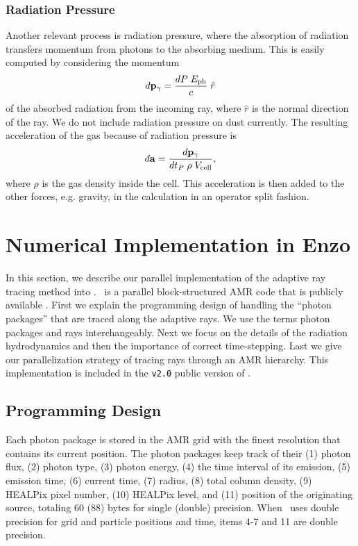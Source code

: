 \documentclass[useAMS,usenatbib]{mn2e}
\begin{document}
\subsubsection{Radiation Pressure}

Another relevant process is radiation pressure, where the absorption
of radiation transfers momentum from photons to the absorbing medium.
This is easily computed by considering the momentum
\begin{equation}
  d\mathbf{p}_\gamma = \frac{dP \; E_{\rm ph}}{c} \; \hat{r}
\end{equation}
of the absorbed radiation from the incoming ray, where $\hat{r}$ is
the normal direction of the ray.  We do not include radiation pressure
on dust currently.  The resulting acceleration of the gas because of
radiation pressure is
\begin{equation}
  d\mathbf{a} = \frac{d\mathbf{p}_\gamma} {dt_P\; \rho \; V_{\rm cell}},
\end{equation}
where $\rho$ is the gas density inside the cell.  This acceleration is
then added to the other forces, e.g. gravity, in the calculation in an
operator split fashion.

\section{Numerical Implementation in Enzo}

In this section, we describe our parallel implementation of the
adaptive ray tracing method into \enzo.  \enzo~is a parallel
block-structured AMR \citep{BergerAMR} code that is publicly available
\citep{BryanNorman1997, OShea2004}.  First we explain the programming
design of handling the ``photon packages'' that are traced along the
adaptive rays.  We use the terms photon packages and rays
interchangeably.  Next we focus on the details of the radiation
hydrodynamics and then the importance of correct time-stepping.  Last
we give our parallelization strategy of tracing rays through an AMR
hierarchy.  This implementation is included in the \texttt{v2.0}
public version of \enzo.

\subsection{Programming Design}
\label{sec:design}

Each photon package is stored in the AMR grid with the finest
resolution that contains its current position.  The photon packages
keep track of their (1) photon flux, (2) photon type, (3) photon
energy, (4) the time interval of its emission, (5) emission time, (6)
current time, (7) radius, (8) total column density, (9) HEALPix pixel
number, (10) HEALPix level, and (11) position of the originating
source, totaling 60 (88) bytes for single (double) precision.  When
\enzo~uses double precision for grid and particle positions and time,
items 4-7 and 11 are double precision.
\end{document}
